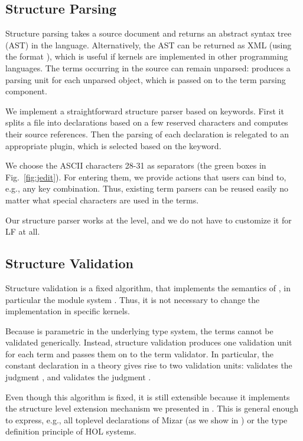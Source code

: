 \subsection{Structure Parsing}\label{sec:sp}

Structure parsing takes a source document and returns an abstract syntax tree (AST) in the \mmt language.
Alternatively, the AST can be returned as XML (using the \omdoc format \cite{omdoc}), which is useful if kernels are implemented in other programming languages.
The terms occurring in the source can remain unparsed: \jmmt produces a parsing unit for each unparsed object, which is passed on to the term parsing component.

\begin{example}
We implement a straightforward structure parser based on keywords.
First it splits a file into declarations based on a few reserved characters and computes their source references.
Then the parsing of each declaration is relegated to an appropriate plugin, which is selected based on the keyword.

We choose the ASCII characters 28-31 as separators (the green boxes in Fig.~\ref{fig:jedit}).
For entering them, we provide \jedit actions that users can bind to, e.g., any key combination.
Thus, existing term parsers can be reused easily no matter what special characters are used in the terms.

Our structure parser works at the \mmt level, and we do not have to customize it for LF at all.
\end{example}

\subsection{Structure Validation}\label{sec:sv}

Structure validation is a fixed algorithm, that implements the semantics of \mmt, in particular the module system \cite{RK:mmt:10}.
Thus, it is not necessary to change the implementation in specific kernels.

Because \mmt is parametric in the underlying type system, the terms cannot be validated generically.
Instead, structure validation produces one validation unit for each term and passes them on to the term validator.
In particular, the constant declaration  in a theory  gives rise to two validation units:
 validates the judgment , and  validates the judgment .

Even though this algorithm is fixed, it is still extensible because it implements the structure level extension mechanism we presented in \cite{HKR:extending:12}.
This is general enough to express, e.g., all toplevel declarations of Mizar (as we show in \cite{IKRU:mizar:11}) or the type definition principle of HOL systems.

